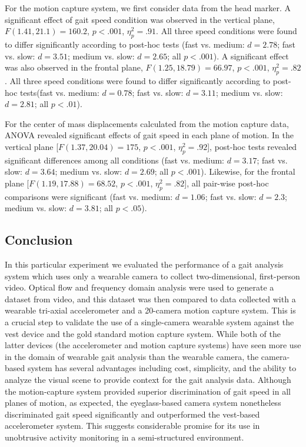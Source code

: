 \documentclass[12pt]{report}
\begin{document}
For the motion capture system, we first consider data from the head marker. A significant effect of gait speed condition was observed in the vertical plane, $F(1.41, 21.1) = 160.2$, $p < .001$, $\eta^2_p = .91$. All three speed conditions were found to differ significantly according to post-hoc tests (fast vs. medium: $d= 2.78$; fast vs. slow: $d= 3.51$; medium vs. slow: $d= 2.65$; all $p< .001$). A significant effect was also observed in the frontal plane, $F(1.25, 18.79) = 66.97$, $p < .001$, $\eta^2_p = .82$. All three speed conditions were found to differ significantly according to post-hoc tests(fast vs. medium: $d= 0.78$; fast vs. slow: $d= 3.11$; medium vs. slow: $d= 2.81$; all $p< .01$).
 
For the center of mass displacements calculated from the motion capture data, ANOVA revealed significant effects of gait speed in each plane of motion. In the vertical plane [$F(1.37,20.04) = 175$, $p < .001$, $\eta^2_p = .92$], post-hoc tests revealed significant differences among all conditions (fast vs. medium: $d= 3.17$; fast vs. slow: $d= 3.64$; medium vs. slow: $d= 2.69$; all $p< .001$). Likewise, for the frontal plane [$F(1.19,17.88) = 68.52$, $p< .001$, $\eta^2_p = .82$], all pair-wise post-hoc comparisons were significant (fast vs. medium: $d= 1.06$; fast vs. slow: $d= 2.3$; medium vs. slow: $d= 3.81$; all $p< .05$).

\subsection{Conclusion}
In this particular experiment we evaluated the performance of a gait analysis system which uses only a wearable camera to collect two-dimensional, first-person video. Optical flow and frequency domain analysis were used to generate a dataset from video, and this dataset was then compared to data collected with a wearable tri-axial accelerometer and a 20-camera motion capture system. This is a crucial step to validate the use of a single-camera wearable system against the vest device and the gold standard motion capture system. While both of the latter devices (the accelerometer and motion capture systems) have seen more use in the domain of wearable gait analysis than the wearable camera, the camera-based system has several advantages including cost, simplicity, and the ability to analyze the visual scene to provide context for the gait analysis data. Although the motion-capture system provided superior discrimination of gait speed in all planes of motion, as expected, the eyeglass-based camera system nonetheless discriminated gait speed significantly and outperformed the vest-based accelerometer system. This suggests considerable promise for its use in unobtrusive activity monitoring in a semi-structured environment.
\end{document}
